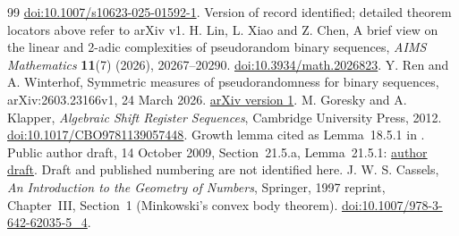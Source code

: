 \documentclass[11pt,a4paper]{article}
\numberwithin{equation}{section}
\theoremstyle{remark}
\begin{document}
\begin{thebibliography}{99}
\href{https://doi.org/10.1007/s10623-025-01592-1}{doi:10.1007/s10623-025-01592-1}.
Version of record identified; detailed theorem locators above refer to arXiv v1.
H. Lin, L. Xiao and Z. Chen,
A brief view on the linear and 2-adic complexities of pseudorandom binary sequences,
\emph{AIMS Mathematics} \textbf{11}(7) (2026), 20267--20290.
\href{https://doi.org/10.3934/math.2026823}{doi:10.3934/math.2026823}.
Y. Ren and A. Winterhof,
Symmetric measures of pseudorandomness for binary sequences,
arXiv:2603.23166v1, 24 March 2026.
\href{https://arxiv.org/abs/2603.23166v1}{arXiv version 1}.
M. Goresky and A. Klapper,
\emph{Algebraic Shift Register Sequences}, Cambridge University Press, 2012.
\href{https://doi.org/10.1017/CBO9781139057448}{doi:10.1017/CBO9781139057448}.
Growth lemma cited as Lemma~18.5.1 in \cite{CWv1}.
Public author draft, 14 October 2009, Section~21.5.a,
Lemma~21.5.1:
\href{https://www.cs.uky.edu/~klapper/pdf/algebraic.pdf}{author draft}.
Draft and published numbering are not identified here.
J. W. S. Cassels,
\emph{An Introduction to the Geometry of Numbers},
Springer, 1997 reprint, Chapter~III, Section~1 (Minkowski's convex body theorem).
\href{https://doi.org/10.1007/978-3-642-62035-5_4}{doi:10.1007/978-3-642-62035-5\_4}.
\end{thebibliography}
\end{document}
